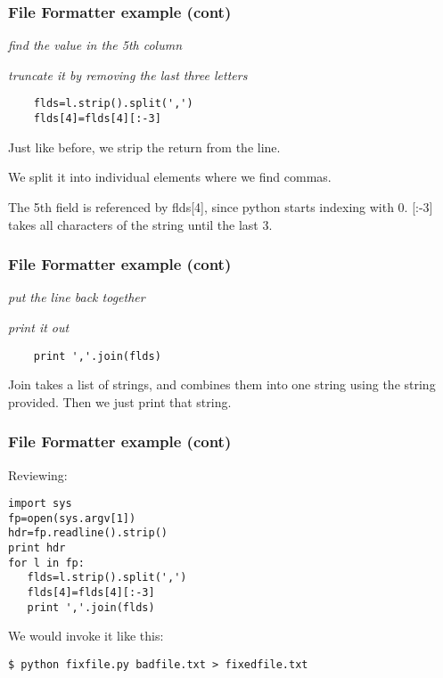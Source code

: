 \documentclass[10pt]{beamer}
\begin{document}
\begin{frame}[fragile]
\frametitle{File Formatter example (cont)}

\textit{find the value in the 5th column}

\textit{truncate it by removing the last three letters}

\begin{verbatim}
    flds=l.strip().split(',')
    flds[4]=flds[4][:-3]
\end{verbatim}

Just like before, we strip the return from the line.  
\vspace{2mm}

We split it into
individual elements where we find commas.  
\vspace{2mm}

The 5th field is referenced by
flds[4], since python starts indexing with 0.  [:-3] takes all characters
of the string until the last 3.
  
\end{frame}

\begin{frame}[fragile]
\frametitle{File Formatter example (cont)}


\textit{put the line back together}

\textit{print it out}

\begin{verbatim}
    print ','.join(flds)
\end{verbatim}

Join takes a list of strings, and combines them into one string using the 
string provided. Then we just print that string.  
 
\end{frame}

\begin{frame}[fragile]
\frametitle{File Formatter example (cont)}

Reviewing:

\begin{verbatim}
import sys
fp=open(sys.argv[1])
hdr=fp.readline().strip()
print hdr
for l in fp:
   flds=l.strip().split(',')
   flds[4]=flds[4][:-3]
   print ','.join(flds)
\end{verbatim}


We would invoke it like this:
\begin{verbatim}
$ python fixfile.py badfile.txt > fixedfile.txt
\end{verbatim}

\end{frame}
\end{document}
